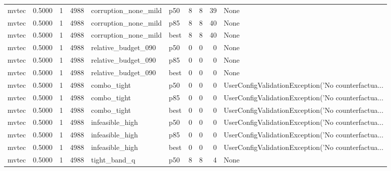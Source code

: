 \begin{tabular}{lrrrllrrrl}
   mvtec &    0.5000 &    1 &   4988 & corruption\_none\_mild &    p50 &               8 &          8 &      39 &                                               None \\
   mvtec &    0.5000 &    1 &   4988 & corruption\_none\_mild &    p85 &               8 &          8 &      40 &                                               None \\
   mvtec &    0.5000 &    1 &   4988 & corruption\_none\_mild &   best &               8 &          8 &      40 &                                               None \\
   mvtec &    0.5000 &    1 &   4988 &  relative\_budget\_090 &    p50 &               0 &          0 &       0 &                                               None \\
   mvtec &    0.5000 &    1 &   4988 &  relative\_budget\_090 &    p85 &               0 &          0 &       0 &                                               None \\
   mvtec &    0.5000 &    1 &   4988 &  relative\_budget\_090 &   best &               0 &          0 &       0 &                                               None \\
   mvtec &    0.5000 &    1 &   4988 &          combo\_tight &    p50 &               0 &          0 &       0 & UserConfigValidationException('No counterfactua... \\
   mvtec &    0.5000 &    1 &   4988 &          combo\_tight &    p85 &               0 &          0 &       0 & UserConfigValidationException('No counterfactua... \\
   mvtec &    0.5000 &    1 &   4988 &          combo\_tight &   best &               0 &          0 &       0 & UserConfigValidationException('No counterfactua... \\
   mvtec &    0.5000 &    1 &   4988 &      infeasible\_high &    p50 &               0 &          0 &       0 & UserConfigValidationException('No counterfactua... \\
   mvtec &    0.5000 &    1 &   4988 &      infeasible\_high &    p85 &               0 &          0 &       0 & UserConfigValidationException('No counterfactua... \\
   mvtec &    0.5000 &    1 &   4988 &      infeasible\_high &   best &               0 &          0 &       0 & UserConfigValidationException('No counterfactua... \\
   mvtec &    0.5000 &    1 &   4988 &         tight\_band\_q &    p50 &               8 &          8 &       4 &                                               None \\

\end{tabular}

